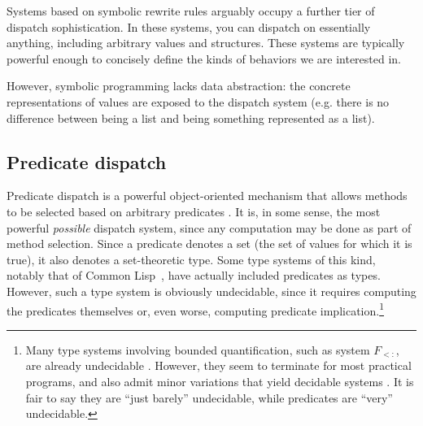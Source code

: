 Systems based on symbolic rewrite rules arguably occupy a further tier of
dispatch sophistication. In these systems, you can dispatch on essentially
anything, including arbitrary values and structures. These systems are
typically powerful enough to concisely define the kinds of behaviors we
are interested in.

However, symbolic programming lacks data abstraction: the concrete
representations of values are exposed to the dispatch system
(e.g. there is no difference between being a list and being something
represented as a list).

\subsection{Predicate dispatch}


Predicate dispatch is a powerful object-oriented mechanism that allows
methods to be selected based on arbitrary predicates \cite{ErnstKC98}.
It is, in some
sense, the most powerful \emph{possible} dispatch system, since any
computation may be done as part of method selection.
Since a predicate denotes a set (the set of values for which it is true),
it also denotes a set-theoretic type.
Some type systems of this kind, notably that of Common
Lisp~\cite{steele1990common:types}, have actually included predicates as types.
However, such a type system is obviously undecidable, since it
requires computing the predicates themselves or, even worse, computing
predicate implication.\footnote{
Many type systems involving bounded quantification, such as system $F_{<:}$,
are already undecidable \cite{Pierce1994131}.
However, they seem to terminate for most practical programs, and also admit
minor variations that yield decidable systems \cite{Castagna:1994:DBQ:174675.177844}.
It is fair to say they are ``just barely'' undecidable, while predicates
are ``very'' undecidable.
}

